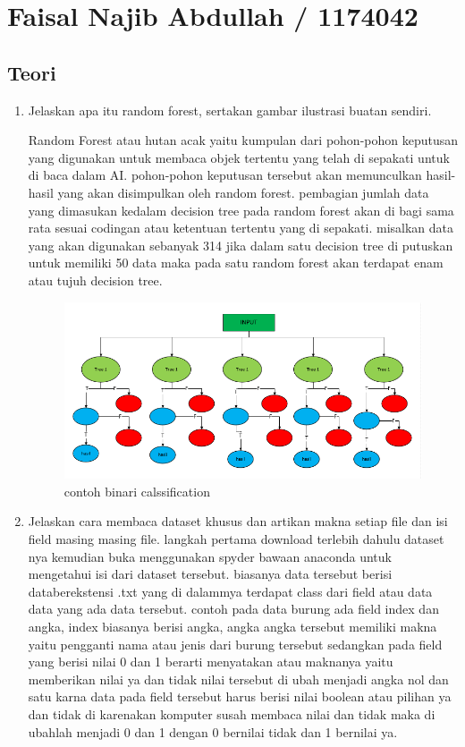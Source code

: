 \section{Faisal Najib Abdullah / 1174042}

\subsection{Teori}
\begin{enumerate}
\item Jelaskan apa itu random forest, sertakan gambar ilustrasi buatan sendiri.\par
Random Forest atau hutan acak yaitu kumpulan dari pohon-pohon keputusan yang digunakan untuk membaca objek tertentu yang telah di sepakati untuk di baca dalam AI. pohon-pohon keputusan tersebut akan memunculkan hasil-hasil yang akan disimpulkan oleh random forest. pembagian jumlah data yang dimasukan kedalam decision tree pada random forest akan di bagi sama rata sesuai codingan atau ketentuan tertentu yang di sepakati. misalkan data yang akan digunakan sebanyak 314 jika dalam satu decision tree di putuskan untuk memiliki 50 data maka pada satu random forest akan terdapat enam atau tujuh decision tree.
\begin{figure}[ht]
\centering
\includegraphics[scale=0.2]{figures/1174042/chapter3/1,1.PNG}
\caption{contoh binari calssification}
\label{contoh}
\end{figure}

\item Jelaskan cara membaca dataset khusus dan artikan makna setiap file dan isi field masing masing file.
langkah pertama download terlebih dahulu dataset nya kemudian buka menggunakan spyder bawaan anaconda untuk mengetahui isi dari dataset tersebut. biasanya data tersebut berisi databerekstensi .txt yang di dalammya terdapat class dari field atau data data yang ada data tersebut. contoh pada data burung ada field index dan angka, index biasanya berisi angka, angka angka tersebut memiliki makna yaitu pengganti nama atau jenis dari burung tersebut sedangkan pada field yang berisi nilai 0 dan 1 berarti menyatakan atau maknanya yaitu memberikan nilai ya dan tidak nilai tersebut di ubah menjadi angka nol dan satu karna data pada field tersebut harus berisi nilai boolean atau pilihan ya dan tidak di karenakan komputer susah membaca nilai dan tidak maka di ubahlah menjadi 0 dan 1 dengan 0 bernilai tidak dan 1 bernilai ya.


\end{enumerate}
